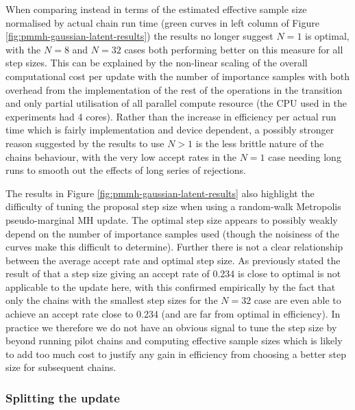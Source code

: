 When comparing instead in terms of the estimated effective sample size normalised by actual chain run time (green curves in left column of Figure \ref{fig:pmmh-gaussian-latent-results}) the results no longer suggest $N=1$ is optimal, with the $N=8$ and $N=32$ cases both performing better on this measure for all step sizes. This can be explained by the non-linear scaling of the overall computational cost per update with the number of importance samples with both overhead from the implementation of the rest of the operations in the transition and only partial utilisation of all parallel compute resource (the \ac{CPU} used in the experiments had 4 cores). Rather than the increase in efficiency per actual run time which is fairly implementation and device dependent, a possibly stronger reason suggested by the results to use $N > 1$ is the less brittle nature of the chains behaviour, with the very low accept rates in the $N=1$ case needing long runs to smooth out the effects of long series of rejections.

The results in Figure \ref{fig:pmmh-gaussian-latent-results} also highlight the difficulty of tuning the proposal step size when using a random-walk Metropolis pseudo-marginal \ac{MH} update. The optimal step size appears to possibly weakly depend on the number of importance samples used (though the noisiness of the curves make this difficult to determine). Further there is not a clear relationship between the average accept rate and optimal step size. As previously stated the result of \citep{gelman1997weak} that a step size giving an accept rate of 0.234 is close to optimal is not applicable to the update here, with this confirmed empirically by the fact that only the chains with the smallest step sizes for the $N=32$ case are even able to achieve an accept rate close to 0.234 (and are far from optimal in efficiency). In practice we therefore we do not have an obvious signal to tune the step size by beyond running pilot chains and computing effective sample sizes which is likely to add too much cost to justify any gain in efficiency from choosing a better step size for subsequent chains.

\subsubsection{Splitting the update}

